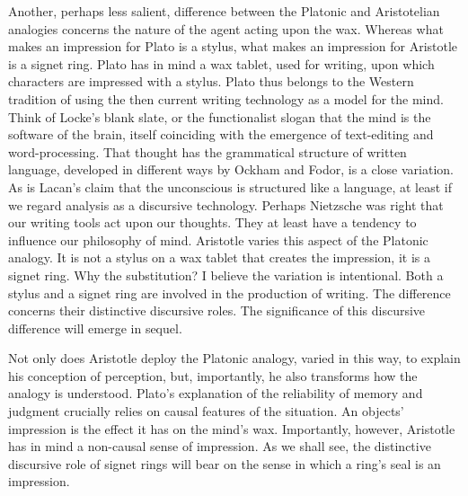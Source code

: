 Another, perhaps less salient, difference between the Platonic and Aristotelian analogies concerns the nature of the agent acting upon the wax. Where\-as what makes an impression for Plato is a stylus, what makes an impression for Aristotle is a signet ring. Plato has in mind a wax tablet, used for writing, upon which characters are impressed with a stylus. Plato thus belongs to the Western tradition of using the then current writing technology as a model for the mind. Think of Locke's blank slate, or the functionalist slogan that the mind is the software of the brain, itself coinciding with the emergence of text-editing and word-processing. That thought has the grammatical structure of written language, developed in different ways by Ockham and Fodor, is a close variation. As is Lacan's claim that the unconscious is structured like a language, at least if we regard analysis as a discursive technology. Perhaps Nietzsche was right that our writing tools act upon our thoughts. They at least have a tendency to influence our philosophy of mind. Aristotle varies this aspect of the Platonic analogy. It is not a stylus on a wax tablet that creates the impression, it is a signet ring. Why the substitution? I believe the variation is intentional. Both a stylus and a signet ring are involved in the production of writing. The difference concerns their distinctive discursive roles. The significance of this discursive difference will emerge in sequel. 

Not only does Aristotle deploy the Platonic analogy, varied in this way, to explain his conception of perception, but, importantly, he also transforms how the analogy is understood. Plato's explanation of the reliability of memory and judgment crucially relies on causal features of the situation. An objects' impression is the effect it has on the mind's wax. Importantly, however, Aristotle has in mind a non-causal sense of impression. As we shall see, the distinctive discursive role of signet rings will bear on the sense in which a ring's seal is an impression.

